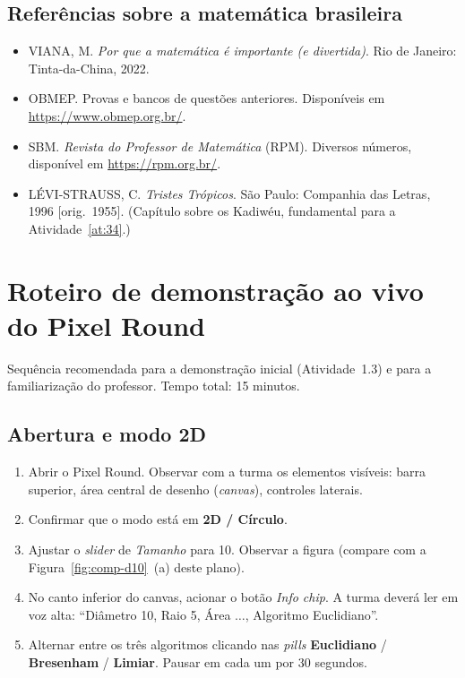 \documentclass[12pt,a4paper]{scrartcl}
\newcommand{\acc}[1]{\textcolor{accent}{\textbf{#1}}}
\begin{document}
\subsection{Referências sobre a matemática brasileira}
\begin{itemize}[leftmargin=1.3em,itemsep=0.15em,topsep=0.3em]
  \item VIANA, M. \emph{Por que a matemática é importante (e divertida)}. Rio de Janeiro: Tinta-da-China, 2022.
  \item OBMEP. Provas e bancos de questões anteriores. Disponíveis em \url{https://www.obmep.org.br/}.
  \item SBM. \emph{Revista do Professor de Matemática} (RPM). Diversos números, disponível em \url{https://rpm.org.br/}.
  \item LÉVI-STRAUSS, C. \emph{Tristes Trópicos}. São Paulo: Companhia das Letras, 1996 [orig.~1955]. (Capítulo sobre os Kadiwéu, fundamental para a Atividade~\ref{at:34}.)
\end{itemize}

\newpage
\appendix
\renewcommand{\thesection}{\Alph{section}}
\setcounter{section}{0}

\section{Roteiro de demonstração ao vivo do Pixel Round}\label{ap:roteiro}

Sequência recomendada para a demonstração inicial (Atividade~1.3) e para a familiarização do professor. Tempo total: 15 minutos.

\subsection{Abertura e modo 2D}
\begin{enumerate}[leftmargin=1.5em,itemsep=0.15em,topsep=0.3em]
  \item Abrir o Pixel Round. Observar com a turma os elementos visíveis: barra superior, área central de desenho (\emph{canvas}), controles laterais.
  \item Confirmar que o modo está em \acc{2D / Círculo}.
  \item Ajustar o \emph{slider} de \emph{Tamanho} para 10. Observar a figura (compare com a Figura~\ref{fig:comp-d10}~(a) deste plano).
  \item No canto inferior do canvas, acionar o botão \emph{Info chip}. A turma deverá ler em voz alta: ``Diâmetro 10, Raio 5, Área $\dots$, Algoritmo Euclidiano''.
  \item Alternar entre os três algoritmos clicando nas \emph{pills} \acc{Euclidiano} / \acc{Bresenham} / \acc{Limiar}. Pausar em cada um por 30 segundos.
\end{enumerate}
\end{document}
